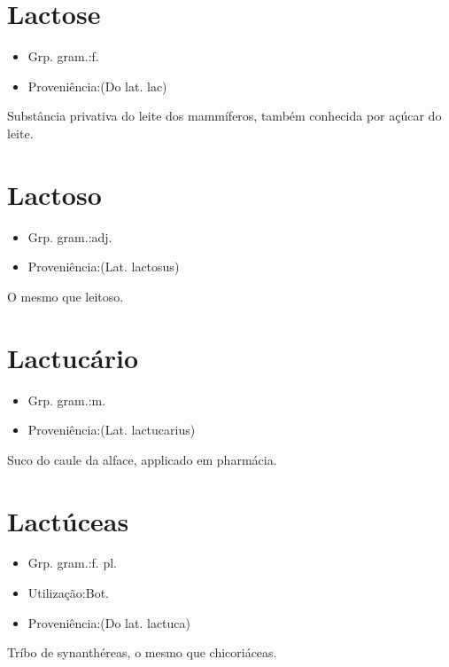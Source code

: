 \section{Lactose}
\begin{itemize}
\item {Grp. gram.:f.}
\end{itemize}
\begin{itemize}
\item {Proveniência:(Do lat. \textunderscore lac\textunderscore )}
\end{itemize}
Substância privativa do leite dos mammíferos, também conhecida por \textunderscore açúcar do leite\textunderscore .
\section{Lactoso}
\begin{itemize}
\item {Grp. gram.:adj.}
\end{itemize}
\begin{itemize}
\item {Proveniência:(Lat. \textunderscore lactosus\textunderscore )}
\end{itemize}
O mesmo que \textunderscore leitoso\textunderscore .
\section{Lactucário}
\begin{itemize}
\item {Grp. gram.:m.}
\end{itemize}
\begin{itemize}
\item {Proveniência:(Lat. \textunderscore lactucarius\textunderscore )}
\end{itemize}
Suco do caule da alface, applicado em pharmácia.
\section{Lactúceas}
\begin{itemize}
\item {Grp. gram.:f. pl.}
\end{itemize}
\begin{itemize}
\item {Utilização:Bot.}
\end{itemize}
\begin{itemize}
\item {Proveniência:(Do lat. \textunderscore lactuca\textunderscore )}
\end{itemize}
Tríbo de synanthéreas, o mesmo que \textunderscore chicoriáceas\textunderscore .
